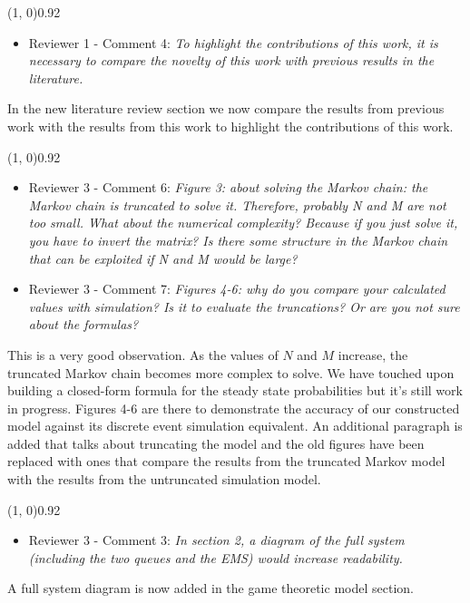 \documentclass{article}
\begin{document}
    \line(1, 0){0.92\textwidth}
    \begin{itemize}
        \item Reviewer 1 - Comment 4: \textit{To highlight the contributions
        of this work, it is necessary to compare the novelty of this work
        with previous results in the literature.}
    \end{itemize}
    In the new literature review section we now compare the results from
    previous work with the results from this work to highlight the
    contributions of this work.

    \line(1, 0){0.92\textwidth}
    \begin{itemize}
        \item Reviewer 3 - Comment 6: \textit{Figure 3: about solving the
        Markov chain: the Markov chain is truncated to solve it. Therefore,
        probably N and M are not too small. What about the numerical
        complexity? Because if you just solve it, you have to invert the
        matrix? Is there some structure in the Markov chain that can be
        exploited if N and M would be large?}
        \item Reviewer 3 - Comment 7: \textit{Figures 4-6: why do you
        compare your calculated values with simulation?
        Is it to evaluate the truncations?
        Or are you not sure about the formulas?}
    \end{itemize}
    This is a very good observation.
    As the values of \(N\) and \(M\) increase, the truncated Markov chain
    becomes more complex to solve.
    We have touched upon building a closed-form formula for the steady state
    probabilities but it's still work in progress.
    Figures 4-6 are there to demonstrate the accuracy of our constructed
    model against its discrete event simulation equivalent.
    An additional paragraph is added that talks about truncating the model
    and the old figures have been replaced with ones that compare the
    results from the truncated Markov model with the results from the
    untruncated simulation model.

    \line(1, 0){0.92\textwidth}
    \begin{itemize}
        \item Reviewer 3 - Comment 3: \textit{In section 2, a diagram
        of the full system (including the two queues and the EMS) would
        increase readability.}
    \end{itemize}
    A full system diagram is now added in the game theoretic model section.
\end{document}

